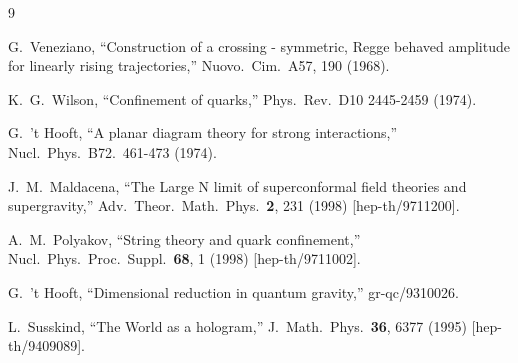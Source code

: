 \documentclass[a4paper]{article}
\numberwithin{equation}{section}
\begin{document}
\newpage



\newpage 




%

\newpage 



\newpage 



\newpage 



\newpage





\begin{thebibliography} {9}

  G.~Veneziano, 
  ``Construction of a crossing - symmetric, Regge behaved amplitude for linearly rising trajectories,'' 
  Nuovo.\ Cim.\ A57, 190 (1968).
  
  K.~G.~Wilson,
  ``Confinement of quarks,''
  Phys.\ Rev.\ D10 2445-2459 (1974).
  
  G.~'t Hooft, 
  ``A planar diagram theory for strong interactions,'' 
  Nucl.\ Phys.\ B72.\ 461-473 (1974).

  J.~M.~Maldacena,
  ``The Large N limit of superconformal field theories and supergravity,''
  Adv.\ Theor.\ Math.\ Phys.\  {\bf 2}, 231 (1998)
  [hep-th/9711200].
  
  A.~M.~Polyakov,
  ``String theory and quark confinement,''
  Nucl.\ Phys.\ Proc.\ Suppl.\  {\bf 68}, 1 (1998)
  [hep-th/9711002].
  
  G.~'t Hooft,
  ``Dimensional reduction in quantum gravity,''
  gr-qc/9310026.
  
  L.~Susskind,
  ``The World as a hologram,''
  J.\ Math.\ Phys.\  {\bf 36}, 6377 (1995)
  [hep-th/9409089].
  

\end{thebibliography}
\end{document}

